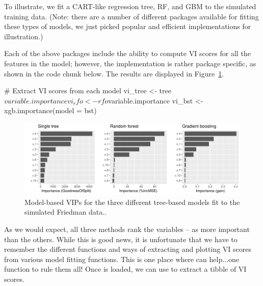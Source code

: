 To illustrate, we fit a CART-like regression tree, RF, and GBM to the simulated training data. (Note: there are a number of different packages available for fitting these types of models, we just picked popular and efficient implementations for illustration.)


Each of the above packages include the ability to compute VI scores for all the features in the model; however, the implementation is rather package specific, as shown in the code chunk below. The results are displayed in Figure~\ref{fig:vi-plots}.

\begin{example}
# Extract VI scores from each model
vi_tree <- tree$variable.importance
vi_rfo <- rfo$variable.importance
vi_bst <- xgb.importance(model = bst)
\end{example}

\begin{figure}[!htb]
  \centering 
  \includegraphics[width=1\linewidth]{figures/vi-plots} 
  \caption{Model-based VIPs for the three different tree-based models fit to the simulated Friedman data..}
  \label{fig:vi-plots}
\end{figure}

As we would expect, all three methods rank the variables -- as more important than the others. While this is good news, it is unfortunate that we have to remember the different functions and ways of extracting and plotting VI scores from various model fitting functions. This is one place where  can help...one function to rule them all! Once  is loaded, we can use  to extract a tibble of VI scores.

